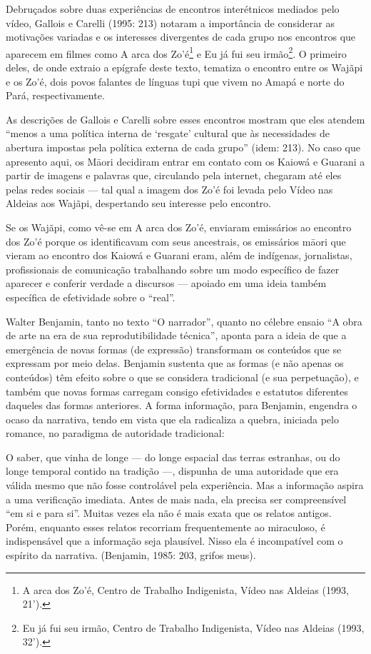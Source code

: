 {{Debruçados sobre duas experiências de encontros interétnicos mediados
pelo vídeo, Gallois e Carelli (1995: 213) notaram a importância de
considerar as motivações variadas e os interesses divergentes de cada
grupo nos encontros que aparecem em filmes como A arca dos
Zo’é\footnote{A arca dos Zo’é, Centro de Trabalho Indigenista, Vídeo
nas Aldeias (1993, 21’).} e Eu já fui seu irmão\footnote{Eu já fui seu
irmão, Centro de Trabalho Indigenista, Vídeo nas Aldeias (1993, 32’).}.
O primeiro deles, de onde extraio a epígrafe deste texto, tematiza o
encontro entre os Wajãpi e os Zo’é, dois povos falantes de línguas tupi
que vivem no Amapá e norte do Pará, respectivamente.

As descrições de Gallois e Carelli sobre esses encontros mostram que
eles atendem ``menos a uma política interna de ‘resgate’ cultural que às
necessidades de abertura impostas pela política externa de cada grupo''
(idem: 213). No caso que apresento aqui, os M\=aori decidiram entrar em
contato com os Kaiowá e Guarani a partir de imagens e palavras que,
circulando pela internet, chegaram até eles pelas redes sociais --- tal
qual a imagem dos Zo’é foi levada pelo Vídeo nas Aldeias aos Wajãpi,
despertando seu interesse pelo encontro.

Se os Wajãpi, como vê-se em A arca dos Zo’é, enviaram emissários ao
encontro dos Zo’é porque os identificavam com seus ancestrais, os
emissários m\=aori que vieram ao encontro dos Kaiowá e Guarani eram,
além de indígenas, jornalistas, profissionais de comunicação
trabalhando sobre um modo específico de fazer aparecer e conferir
verdade a discursos --- apoiado em uma ideia também específica de
efetividade sobre o ``real''.

Walter Benjamin, tanto no texto ``O narrador'', quanto no célebre ensaio ``A
obra de arte na era de sua reprodutibilidade técnica'', aponta para a
ideia de que a emergência de novas formas (de expressão) transformam os
conteúdos que se expressam por meio delas. Benjamin sustenta que as
formas (e não apenas os conteúdos) têm efeito sobre o que se considera
tradicional (e sua perpetuação), e também que novas formas carregam
consigo efetividades e estatutos diferentes daqueles das formas
anteriores. A forma informação, para Benjamin, engendra o ocaso da
narrativa, tendo em vista que ela radicaliza a quebra, iniciada pelo
romance, no paradigma de autoridade tradicional:

O saber, que vinha de longe --- do longe espacial das terras estranhas, ou
do longe temporal contido na tradição ---, dispunha de uma autoridade que
era válida mesmo que não fosse controlável pela experiência. Mas a
informação aspira a uma verificação imediata. Antes de mais nada, ela
precisa ser compreensível ``em si e para si''. Muitas vezes ela não é
mais exata que os relatos antigos. Porém, enquanto esses relatos
recorriam frequentemente ao miraculoso, é indispensável que a
informação seja plausível. Nisso ela é incompatível com o espírito da
narrativa. (Benjamin, 1985: 203, grifos meus).

}}
